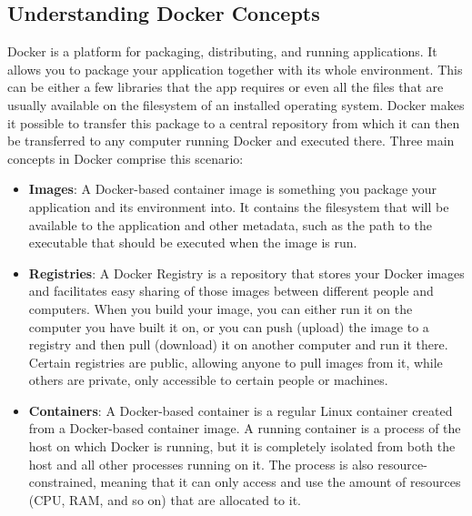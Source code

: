 \subsection{Understanding Docker Concepts}
Docker is a platform for packaging, distributing, and running applications. It allows you to package your application together with its whole environment. This can be either a few libraries that the app requires or even all the files that are usually available on the filesystem of an installed operating system. Docker makes it possible to transfer this package to a central repository from which it can then be transferred to any computer running Docker and executed there.
Three main concepts in Docker comprise this scenario:

\begin{itemize}
	\item \textbf{Images}: A Docker-based container image is something you package your application and its environment into. It contains the filesystem that will be available to the application and other metadata, such as the path to the executable that should be executed when the image is run.
	\item \textbf{Registries}: A Docker Registry is a repository that stores your Docker images and facilitates easy sharing of those images between different people and computers. When you build your image, you can either run it on the computer you have built it on, or you can push (upload) the image to a registry and then pull (download) it on another computer and run it there. Certain registries are public, allowing anyone to pull images from it, while others are private, only accessible to certain people or machines.
	\item \textbf{Containers}: A Docker-based container is a regular Linux container created from a Docker-based container image. A running container is a process of the host on which Docker is running, but it is completely isolated from both the host and all other processes running on it. The process is also resource-constrained, meaning that it can only access and use the amount of resources (CPU, RAM, and so on) that are allocated to it.
\end{itemize}

